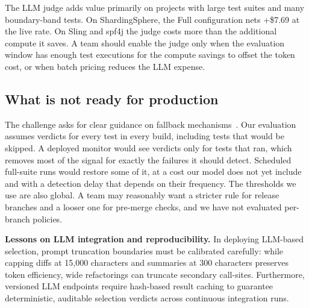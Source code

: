The LLM judge adds value primarily on projects with large test suites and many boundary-band tests. On ShardingSphere, the Full configuration nets +\$7.69 at the live rate. On Sling and spf4j the judge costs more than the additional compute it saves. A team should enable the judge only when the evaluation window has enough test executions for the compute savings to offset the token cost, or when batch pricing reduces the LLM expense.

\subsection{What is not ready for production}

The challenge asks for clear guidance on fallback mechanisms~\cite{challenge}. Our evaluation assumes verdicts for every test in every build, including tests that would be skipped. A deployed monitor would see verdicts only for tests that ran, which removes most of the signal for exactly the failures it should detect. Scheduled full-suite runs would restore some of it, at a cost our model does not yet include and with a detection delay that depends on their frequency. The thresholds we use are also global. A team may reasonably want a stricter rule for release branches and a looser one for pre-merge checks, and we have not evaluated per-branch policies.

\textbf{Lessons on LLM integration and reproducibility.} In deploying LLM-based selection, prompt truncation boundaries must be calibrated carefully: while capping diffs at 15,000 characters and summaries at 300 characters preserves token efficiency, wide refactorings can truncate secondary call-sites. Furthermore, versioned LLM endpoints require hash-based result caching to guarantee deterministic, auditable selection verdicts across continuous integration runs.
